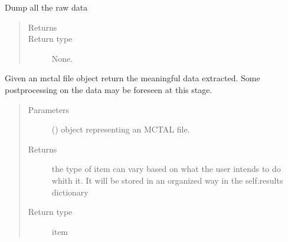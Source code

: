 \documentclass[letterpaper,10pt,english]{sphinxmanual}
\begin{document}
\begin{fulllineitems}

\begin{fulllineitems}
\label{\detokenize{api/postprocessing:expoutput.ExperimentalOutput._print_raw}}
Dump all the raw data
\begin{quote}\begin{description}
\item[{Returns}] \leavevmode


\item[{Return type}] \leavevmode
None.

\end{description}\end{quote}

\end{fulllineitems}


\begin{fulllineitems}
\label{\detokenize{api/postprocessing:expoutput.ExperimentalOutput._processMCNPdata}}
Given an mctal file object return the meaningful data extracted. Some
post\sphinxhyphen{}processing on the data may be foreseen at this stage.
\begin{quote}\begin{description}
\item[{Parameters}] \leavevmode
{} () \textendash{} object representing an MCTAL file.

\item[{Returns}] \leavevmode
the type of item can vary based on what the user intends to do
whith it. It will be stored in an organized way in the self.results
dictionary

\item[{Return type}] \leavevmode
item

\end{description}\end{quote}

\end{fulllineitems}


\end{fulllineitems}
\end{document}
